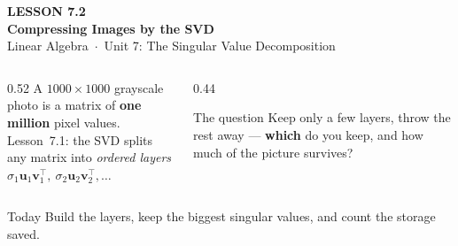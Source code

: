 \documentclass[aspectratio=169, 11pt]{beamer}
\newcommand{\uu}{\mathbf{u}}
\newcommand{\vv}{\mathbf{v}}
\newcommand{\T}{^{\top}}
\begin{document}
{
\begin{frame}[plain]
  \vspace{2.8cm}\hspace{0.55cm}%
  \begin{minipage}{0.9\textwidth}
    {\color{goldacc}\bfseries\small LESSON 7.2}\\[0.5cm]
    {\color{white}\bfseries\LARGE Compressing Images by the SVD}\\[1.0cm]
    {\color{blushmid}\small Linear Algebra~$\cdot$~Unit 7: The Singular Value Decomposition}
  \end{minipage}
\end{frame}
}

\begin{frame}[t, plain]
  \begin{columns}[T]
    \begin{column}{0.52\textwidth}
      A $1000\times1000$ grayscale photo is a matrix of \textbf{one million} pixel values.\\[6pt]
      Lesson~7.1: the SVD splits any matrix into \emph{ordered layers}
      $\sigma_1\uu_1\vv_1\T,\ \sigma_2\uu_2\vv_2\T,\dots$
    \end{column}
    \begin{column}{0.44\textwidth}
      \begin{block}{The question}
        Keep only a few layers, throw the rest away --- \textbf{which} do you keep, and how much of the
        picture survives?
      \end{block}
    \end{column}
  \end{columns}
  \vspace{2pt}
  \begin{block}{Today}
    Build the layers, keep the biggest singular values, and count the storage saved.
  \end{block}
\end{frame}
\end{document}
